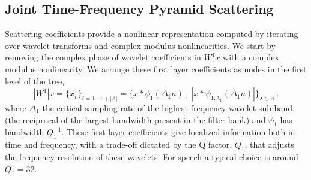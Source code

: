 \subsection{Joint Time-Frequency Pyramid Scattering}

Scattering coefficients provide a nonlinear representation 
computed by iterating over wavelet transforms and complex modulus nonlinearities. 
%
We start by removing the complex phase of wavelet coefficients in $W^1x$ with a 
complex modulus nonlinearity. We arrange these first layer coefficients as nodes in the first level of the tree,
\[
|W^1| x = \{ x^1_i \}_{i=1\dots 1+|\Lambda|}= \{x \ast \phi_1(\Delta_1 n)~,~|x \ast \psi_{1,\lambda_1}(\Delta_1 n)|  \}_{\lambda \in \Lambda}~.
\]
where $\Delta_1$ the critical sampling rate of the highest frequency wavelet sub-band. 
(the reciprocal of the largest bandwidth present
in the filter bank) and $\psi_1$ has bandwidth $Q_1^{-1}$.
These first layer coefficients give localized information both in
time and frequency, with a trade-off dictated by the Q factor, $Q_1$, that adjusts the frequency resolution of 
these wavelets.  For speech a typical choice is around $Q_1=32$.

